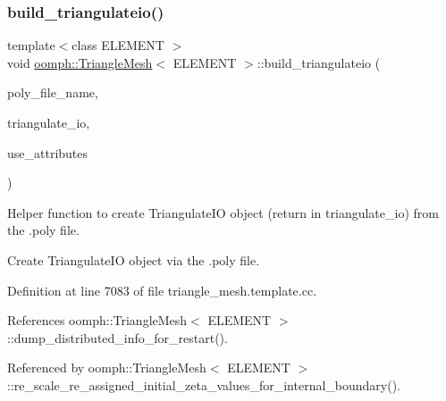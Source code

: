 \subsubsection{\texorpdfstring{build\+\_\+triangulateio()}{build\_triangulateio()}}
{\footnotesize\ttfamily template$<$class E\+L\+E\+M\+E\+NT $>$ \\
void \hyperlink{classoomph_1_1TriangleMesh}{oomph\+::\+Triangle\+Mesh}$<$ E\+L\+E\+M\+E\+NT $>$\+::build\+\_\+triangulateio (\begin{DoxyParamCaption}\item[{const std\+::string \&}]{poly\+\_\+file\+\_\+name,  }\item[{Triangulate\+IO \&}]{triangulate\+\_\+io,  }\item[{bool \&}]{use\+\_\+attributes }\end{DoxyParamCaption})\hspace{0.3cm}{\ttfamily [protected]}}



Helper function to create Triangulate\+IO object (return in triangulate\+\_\+io) from the .poly file. 

Create Triangulate\+IO object via the .poly file. 

Definition at line 7083 of file triangle\+\_\+mesh.\+template.\+cc.



References oomph\+::\+Triangle\+Mesh$<$ E\+L\+E\+M\+E\+N\+T $>$\+::dump\+\_\+distributed\+\_\+info\+\_\+for\+\_\+restart().



Referenced by oomph\+::\+Triangle\+Mesh$<$ E\+L\+E\+M\+E\+N\+T $>$\+::re\+\_\+scale\+\_\+re\+\_\+assigned\+\_\+initial\+\_\+zeta\+\_\+values\+\_\+for\+\_\+internal\+\_\+boundary().

\mbox{\label{classoomph_1_1TriangleMesh_a243e3d1dbf7c545a707dff522678f755}} 

